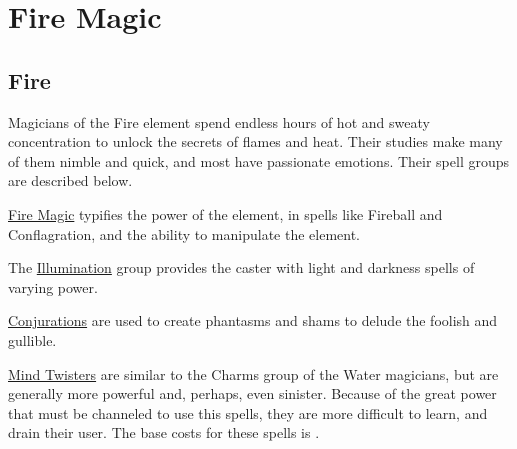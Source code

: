 \chapter{Fire Magic}
\label{Ch:elemental-Fire-magic}

\section{Fire}

Magicians of the Fire element spend endless hours of hot and sweaty concentration to unlock the secrets of flames and heat. Their studies make many of them nimble and quick, and most have passionate emotions. Their spell groups are described below.

\ul{Fire Magic} typifies the power of the element, in spells like Fireball and Conflagration, and the ability to manipulate the element.

The \ul{Illumination} group provides the caster with light and darkness spells of varying power.

\ul{Conjurations} are used to create phantasms and shams to delude the foolish and gullible.

\ul{Mind Twisters} are similar to the Charms group of the Water magicians, but are generally more powerful and, perhaps, even sinister. Because of the great power that must be channeled to use this spells, they are more difficult to learn, and drain their user. The base costs for these spells is . 

